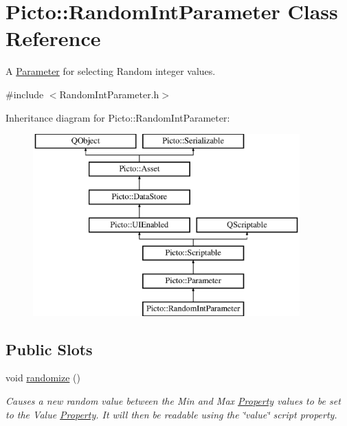 \hypertarget{class_picto_1_1_random_int_parameter}{\section{Picto\-:\-:Random\-Int\-Parameter Class Reference}
\label{class_picto_1_1_random_int_parameter}
}


A \hyperlink{class_picto_1_1_parameter}{Parameter} for selecting Random integer values.  




{\ttfamily \#include $<$Random\-Int\-Parameter.\-h$>$}

Inheritance diagram for Picto\-:\-:Random\-Int\-Parameter\-:\begin{figure}[H]
\begin{center}
\leavevmode
\includegraphics[height=7.000000cm]{class_picto_1_1_random_int_parameter}
\end{center}
\end{figure}
\subsection*{Public Slots}
\begin{DoxyCompactItemize}
\item 
\hypertarget{class_picto_1_1_random_int_parameter_a2995dcbd9542ebeb1e880c573125a962}{void \hyperlink{class_picto_1_1_random_int_parameter_a2995dcbd9542ebeb1e880c573125a962}{randomize} ()}\label{class_picto_1_1_random_int_parameter_a2995dcbd9542ebeb1e880c573125a962}

\begin{DoxyCompactList}\small\item\em Causes a new random value between the Min and Max \hyperlink{class_picto_1_1_property}{Property} values to be set to the Value \hyperlink{class_picto_1_1_property}{Property}. It will then be readable using the \char`\"{}value\char`\"{} script property. \end{DoxyCompactList}\end{DoxyCompactItemize}
